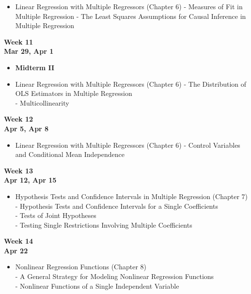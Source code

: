 \documentclass[
]{book}
\providecommand{\tightlist}{%
  \setlength{\itemsep}{0pt}\setlength{\parskip}{0pt}}
\begin{document}
\begin{itemize}
\tightlist
\item
  Linear Regression with Multiple Regressors (Chapter 6)
  - Measures of Fit in Multiple Regression
  - The Least Squares Assumptions for Causal Inference in Multiple Regression
\end{itemize}

\textbf{Week 11}\\
\textbf{Mar 29, Apr 1}

\begin{itemize}
\item
  \textbf{Midterm II}
\item
  Linear Regression with Multiple Regressors (Chapter 6)
  - The Distribution of OLS Estimators in Multiple Regression\\
  - Multicollinearity
\end{itemize}

\textbf{Week 12}\\
\textbf{Apr 5, Apr 8}

\begin{itemize}
\tightlist
\item
  Linear Regression with Multiple Regressors (Chapter 6)
  - Control Variables and Conditional Mean Independence
\end{itemize}

\textbf{Week 13}\\
\textbf{Apr 12, Apr 15}

\begin{itemize}
\tightlist
\item
  Hypothesis Tests and Confidence Intervals in Multiple Regression (Chapter 7)\\
  - Hypothesis Tests and Confidence Intervals for a Single Coefficients\\
  - Tests of Joint Hypotheses\\
  - Testing Single Restrictions Involving Multiple Coefficients
\end{itemize}

\textbf{Week 14}\\
\textbf{Apr 22}

\begin{itemize}
\tightlist
\item
  Nonlinear Regression Functions (Chapter 8)\\
  - A General Strategy for Modeling Nonlinear Regression Functions\\
  - Nonlinear Functions of a Single Independent Variable
\end{itemize}
\end{document}
